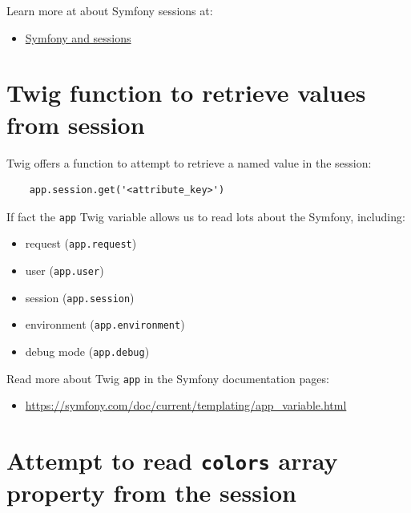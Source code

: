 \documentclass[a4paperpaper,openright]{book}
\providecommand{\tightlist}{%
  \setlength{\itemsep}{0pt}\setlength{\parskip}{0pt}}
\begin{document}
Learn more at about Symfony sessions at:

\begin{itemize}
\tightlist
\item
  \href{http://symfony.com/doc/current/components/http_foundation/sessions.html}{Symfony
  and sessions}
\end{itemize}

\hypertarget{twig-function-to-retrieve-values-from-session}{%
\section{Twig function to retrieve values from
session}\label{twig-function-to-retrieve-values-from-session}}

Twig offers a function to attempt to retrieve a named value in the
session:

\begin{verbatim}
    app.session.get('<attribute_key>')
\end{verbatim}

If fact the \texttt{app} Twig variable allows us to read lots about the
Symfony, including:

\begin{itemize}
\item
  request (\texttt{app.request})
\item
  user (\texttt{app.user})
\item
  session (\texttt{app.session})
\item
  environment (\texttt{app.environment})
\item
  debug mode (\texttt{app.debug})
\end{itemize}

Read more about Twig \texttt{app} in the Symfony documentation pages:

\begin{itemize}
\tightlist
\item
  \url{https://symfony.com/doc/current/templating/app_variable.html}
\end{itemize}

\hypertarget{attempt-to-read-colors-array-property-from-the-session}{%
\section{\texorpdfstring{Attempt to read \texttt{colors} array property
from the
session}{Attempt to read colors array property from the session}}\label{attempt-to-read-colors-array-property-from-the-session}}
\end{document}

